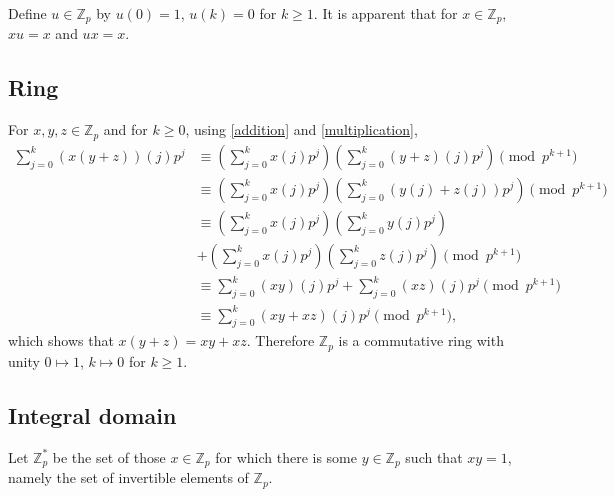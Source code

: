 \documentclass{article}
\theoremstyle{definition}
\begin{document}
Define $u \in \mathbb{Z}_p$ by $u(0)=1$, $u(k)=0$ for $k \geq 1$. It is apparent that for $x \in \mathbb{Z}_p$, $xu=x$
and $ux=x$. 


\subsection{Ring}
For $x,y,z \in \mathbb{Z}_p$ and for $k \geq 0$, using \eqref{addition} and \eqref{multiplication},
\begin{align*}
\sum_{j=0}^k (x(y+z))(j) p^j&\equiv \left( \sum_{j=0}^k x(j) p^j \right)\left( \sum_{j=0}^k (y+z)(j) p^j \right) \pmod{p^{k+1}}\\
&\equiv  \left( \sum_{j=0}^k x(j) p^j \right) \left(\sum_{j=0}^k (y(j)+z(j)) p^j\right) \pmod{p^{k+1}}\\
&\equiv  \left( \sum_{j=0}^k x(j) p^j \right) \left( \sum_{j=0}^k y(j) p^j \right)\\
&+ \left( \sum_{j=0}^k x(j) p^j \right) \left( \sum_{j=0}^k z(j) p^j \right) \pmod{p^{k+1}}\\
&\equiv \sum_{j=0}^k (xy)(j) p^j  + \sum_{j=0}^k (xz)(j) p^j \pmod{p^{k+1}}\\
&\equiv \sum_{j=0}^k (xy+xz)(j) p^j \pmod{p^{k+1}},
\end{align*}
which shows that $x(y+z)=xy+xz$. Therefore $\mathbb{Z}_p$ is a commutative ring with unity
$0 \mapsto 1$, $k \mapsto 0$ for $k \geq 1$. 



\subsection{Integral domain}
Let $\mathbb{Z}_p^*$ be the set of those $x \in \mathbb{Z}_p$ for which there is some $y \in \mathbb{Z}_p$ such that
$xy=1$, namely the set of invertible elements of $\mathbb{Z}_p$. 
\end{document}
